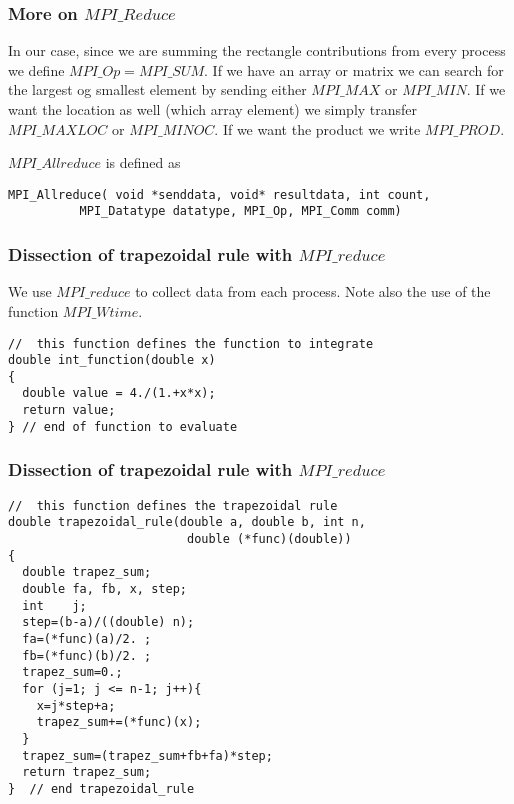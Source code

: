 \documentclass{beamer}
\begin{document}
\begin{frame}
\frametitle{More on $MPI\_Reduce$}

\begin{block}{}
In our case, since we are summing
the rectangle  contributions from every process we define  $MPI\_Op = MPI\_SUM$.
If we have an array or matrix we can search for the largest og smallest element by sending either $MPI\_MAX$ or 
$MPI\_MIN$.  If we want the location as well (which array element) we simply transfer 
$MPI\_MAXLOC$ or $MPI\_MINOC$. If we want the product we write $MPI\_PROD$. 

$MPI\_Allreduce$ is defined as
\begin{verbatim}
MPI_Allreduce( void *senddata, void* resultdata, int count, 
          MPI_Datatype datatype, MPI_Op, MPI_Comm comm)        
\end{verbatim}


\end{block}
\end{frame}

\begin{frame}
\frametitle{Dissection of trapezoidal rule with $MPI\_reduce$}

\begin{block}{}

We use $MPI\_reduce$ to collect data from each process. Note also the use of the function 
$MPI\_Wtime$. 
\begin{verbatim}
//  this function defines the function to integrate
double int_function(double x)
{
  double value = 4./(1.+x*x);
  return value;
} // end of function to evaluate

\end{verbatim}


\end{block}
\end{frame}

\begin{frame}
\frametitle{Dissection of trapezoidal rule with $MPI\_reduce$}

\begin{block}{}
\begin{verbatim}
//  this function defines the trapezoidal rule
double trapezoidal_rule(double a, double b, int n, 
                         double (*func)(double))
{
  double trapez_sum;
  double fa, fb, x, step;
  int    j;
  step=(b-a)/((double) n);
  fa=(*func)(a)/2. ;
  fb=(*func)(b)/2. ;
  trapez_sum=0.;
  for (j=1; j <= n-1; j++){
    x=j*step+a;
    trapez_sum+=(*func)(x);
  }
  trapez_sum=(trapez_sum+fb+fa)*step;
  return trapez_sum;
}  // end trapezoidal_rule 
\end{verbatim}


\end{block}
\end{frame}
\end{document}
